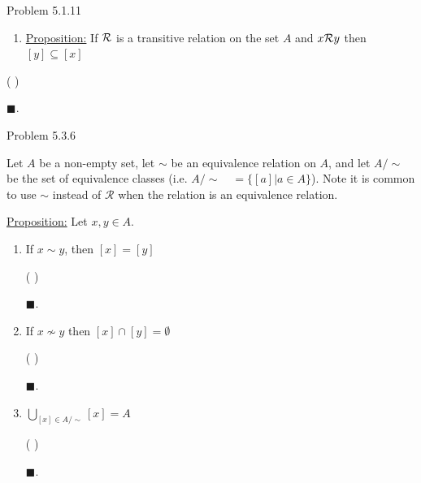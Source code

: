 \documentclass{article}
\theoremstyle{definition}
\renewcommand{\qed}{\blacksquare}
\begin{document}

	\noindent Problem 5.1.11
	\vspace{0.2cm}

	\begin{enumerate}
		\item[3]
		\underline{Proposition:}
		If ${\cal R}$ is a transitive relation on the set $A$ and $x{\cal R}y$ then $[y] \subseteq [x]$

	\end{enumerate}

	\vspace{0.2cm}
	 ( )
	\vspace{0.2cm}

	$\qed$.

	\vspace{0.5cm}


	\noindent Problem 5.3.6
	\vspace{0.2cm}

	Let $A$ be a non-empty set, let $\sim$ be an equivalence relation on $A$, and let $A / \sim$ be the set of equivalence classes (i.e. $A / \sim \quad = \{[a]|a \in A\}$). Note it is common to use $\sim$ instead of $\mathcal{R}$ when the relation is an equivalence relation.

	\vspace{0.2cm}
	\underline{Proposition:} Let $x, y \in A$.

	\begin{enumerate}
		\item[a]
		If $x \sim y$, then $[x] = [y]$

		\vspace{0.2cm}
		 ( )
		\vspace{0.2cm}

		$\qed$.

		\vspace{0.2cm}

		\item[b]
		If $x \not \sim y$ then $[x] \cap [y] = \emptyset$

		\vspace{0.2cm}
		 ( )
		\vspace{0.2cm}

		$\qed$.

		\vspace{0.2cm}

		\item[c]
		$\bigcup_{[x] \in A / \sim}[x] = A$

		\vspace{0.2cm}
		 ( )
		\vspace{0.2cm}

		$\qed$.

		\vspace{0.5cm}

	\end{enumerate}

\end{document}

